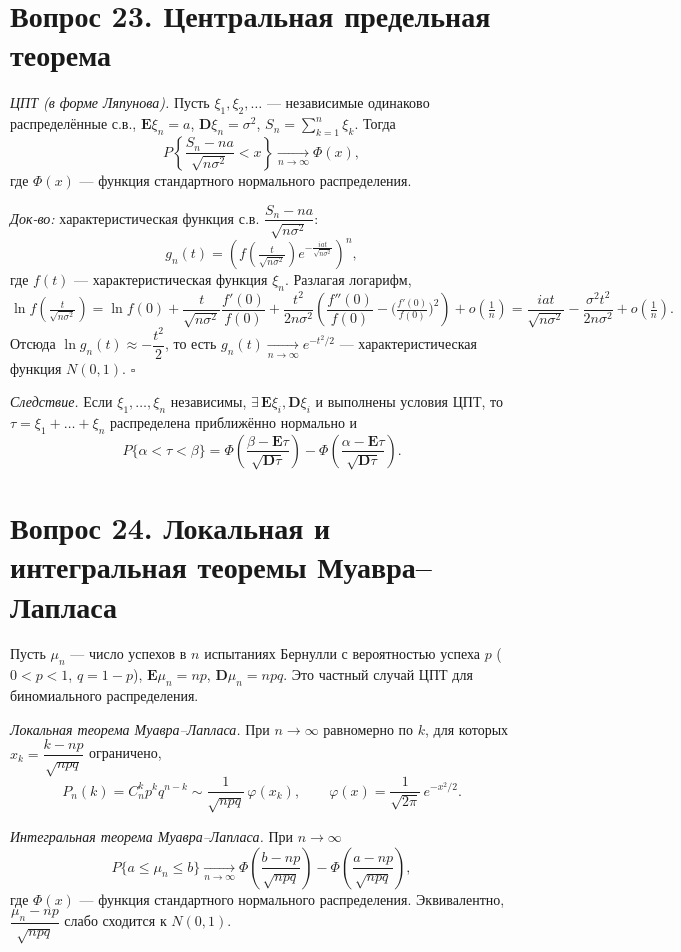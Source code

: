 \section*{Вопрос 23. Центральная предельная теорема}

\textit{ЦПТ (в форме Ляпунова).} Пусть $\xi_1,\xi_2,\dots$ — независимые одинаково распределённые с.в., $\mathbf{E}\xi_n=a$, $\mathbf{D}\xi_n=\sigma^2$, $S_n=\sum_{k=1}^n\xi_k$. Тогда
\[ P\!\left\{\frac{S_n-na}{\sqrt{n\sigma^2}}<x\right\}\xrightarrow[n\to\infty]{}\Phi(x), \]
где $\Phi(x)$ — функция стандартного нормального распределения.

\textit{Док-во:} характеристическая функция с.в. $\dfrac{S_n-na}{\sqrt{n\sigma^2}}$:
\[ g_n(t)=\left(f\!\left(\tfrac{t}{\sqrt{n\sigma^2}}\right)e^{-\frac{iat}{\sqrt{n\sigma^2}}}\right)^{\!n}, \]
где $f(t)$ — характеристическая функция $\xi_n$. Разлагая логарифм,
\[ \ln f\!\left(\tfrac{t}{\sqrt{n\sigma^2}}\right)=\ln f(0)+\frac{t}{\sqrt{n\sigma^2}}\frac{f'(0)}{f(0)}+\frac{t^2}{2n\sigma^2}\!\left(\frac{f''(0)}{f(0)}-\Big(\tfrac{f'(0)}{f(0)}\Big)^2\right)+o\!\left(\tfrac1n\right)=\frac{iat}{\sqrt{n\sigma^2}}-\frac{\sigma^2t^2}{2n\sigma^2}+o\!\left(\tfrac1n\right). \]
Отсюда $\ln g_n(t)\approx-\dfrac{t^2}{2}$, то есть $g_n(t)\xrightarrow[n\to\infty]{}e^{-t^2/2}$ — характеристическая функция $N(0,1)$. \hfill$\square$

\textit{Следствие.} Если $\xi_1,\dots,\xi_n$ независимы, $\exists\,\mathbf{E}\xi_i,\mathbf{D}\xi_i$ и выполнены условия ЦПТ, то $\tau=\xi_1+\dots+\xi_n$ распределена приближённо нормально и
\[ P\{\alpha<\tau<\beta\}=\Phi\!\left(\frac{\beta-\mathbf{E}\tau}{\sqrt{\mathbf{D}\tau}}\right)-\Phi\!\left(\frac{\alpha-\mathbf{E}\tau}{\sqrt{\mathbf{D}\tau}}\right). \]

\section*{Вопрос 24. Локальная и интегральная теоремы Муавра--Лапласа}

Пусть $\mu_n$ — число успехов в $n$ испытаниях Бернулли с вероятностью успеха $p$ ($0<p<1$, $q=1-p$), $\mathbf{E}\mu_n=np$, $\mathbf{D}\mu_n=npq$. Это частный случай ЦПТ для биномиального распределения.

\textit{Локальная теорема Муавра--Лапласа.} При $n\to\infty$ равномерно по $k$, для которых $x_k=\dfrac{k-np}{\sqrt{npq}}$ ограничено,
\[ P_n(k)=C_n^k p^k q^{n-k}\sim\frac{1}{\sqrt{npq}}\,\varphi(x_k),\qquad \varphi(x)=\frac{1}{\sqrt{2\pi}}\,e^{-x^2/2}. \]

\textit{Интегральная теорема Муавра--Лапласа.} При $n\to\infty$
\[ P\{a\le\mu_n\le b\}\xrightarrow[n\to\infty]{}\Phi\!\left(\frac{b-np}{\sqrt{npq}}\right)-\Phi\!\left(\frac{a-np}{\sqrt{npq}}\right), \]
где $\Phi(x)$ — функция стандартного нормального распределения. Эквивалентно, $\dfrac{\mu_n-np}{\sqrt{npq}}$ слабо сходится к $N(0,1)$.
